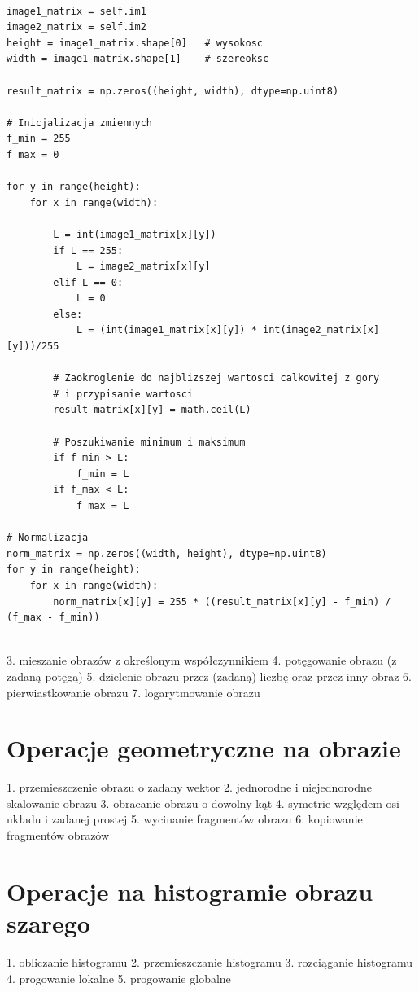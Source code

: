 \documentclass[final,a4paper,openany,12pt]{mwbk}
\begin{document}
\begin{lstlisting}[caption=Mnożenie obrazu barwowego przez inny obraz ]

image1_matrix = self.im1
image2_matrix = self.im2
height = image1_matrix.shape[0]   # wysokosc
width = image1_matrix.shape[1]    # szereoksc

result_matrix = np.zeros((height, width), dtype=np.uint8)

# Inicjalizacja zmiennych
f_min = 255
f_max = 0

for y in range(height):
    for x in range(width):  

        L = int(image1_matrix[x][y]) 
        if L == 255:
            L = image2_matrix[x][y]
        elif L == 0:
            L = 0
        else:
            L = (int(image1_matrix[x][y]) * int(image2_matrix[x][y]))/255 

        # Zaokroglenie do najblizszej wartosci calkowitej z gory
        # i przypisanie wartosci
        result_matrix[x][y] = math.ceil(L)
                        
        # Poszukiwanie minimum i maksimum
        if f_min > L:
            f_min = L
        if f_max < L:
            f_max = L

# Normalizacja
norm_matrix = np.zeros((width, height), dtype=np.uint8)
for y in range(height):
    for x in range(width):
        norm_matrix[x][y] = 255 * ((result_matrix[x][y] - f_min) / (f_max - f_min))
    

\end{lstlisting}


3. mieszanie obrazów z określonym współczynnikiem
4. potęgowanie obrazu (z zadaną potęgą)
5. dzielenie obrazu przez (zadaną) liczbę oraz przez inny obraz
6. pierwiastkowanie obrazu
7. logarytmowanie obrazu

\chapter{Operacje geometryczne na obrazie}
1. przemieszczenie obrazu o zadany wektor
2. jednorodne i niejednorodne skalowanie obrazu
3. obracanie obrazu o dowolny kąt
4. symetrie względem osi układu i zadanej prostej
5. wycinanie fragmentów obrazu
6. kopiowanie fragmentów obrazów

\chapter{Operacje na histogramie obrazu szarego}
1. obliczanie histogramu
2. przemieszczanie histogramu
3. rozciąganie histogramu
4. progowanie lokalne
5. progowanie globalne
\end{document}
